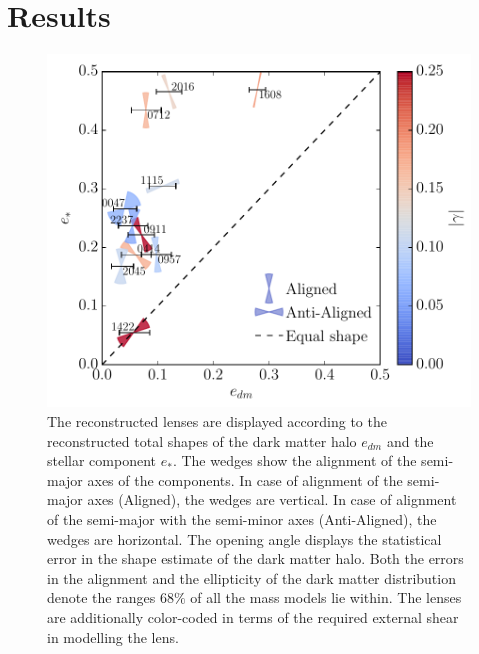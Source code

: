 \documentclass[useAMS,usenatbib]{mn2e}
\begin{document}
\section{Results}\label{sec:results}
\begin{figure}
  \centering
  \includegraphics[width=.8\linewidth]{Figures/wedges_shears.pdf}
  \caption[width=\linewidth]{The reconstructed lenses are displayed according to the reconstructed total shapes of the dark matter halo $e_{dm}$ and the stellar component $e_{*}$. The wedges show the alignment of the semi-major axes of the components. In case of alignment of the semi-major axes (Aligned), the wedges are vertical. In case of alignment of the semi-major with the semi-minor axes (Anti-Aligned), the wedges are horizontal. The opening angle displays the statistical error in the shape estimate of the dark matter halo. Both the errors in the alignment and the ellipticity of the dark matter distribution denote the ranges $68\%$ of all the mass models lie within. The lenses are additionally color-coded in terms of the required external shear in modelling the lens.}
  \label{fig:wedgesall}
\end{figure}
\end{document}

